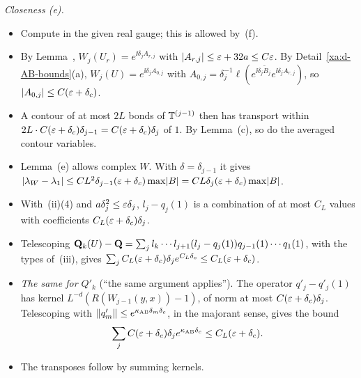 \begin{detail}
\emph{Closeness (e).}
\begin{itemize}
\item Compute in the given real gauge; this is allowed by~(f).
\item By Lemma~, $W_j(U_r)=e^{\ii\delta_jA_{r,j}}$ with $\lvert A_{r,j}\rvert\le\varepsilon+32a\le C\varepsilon$. By Detail~\ref{xa:d-AB-bounds}(a), $W_j(U)=e^{\ii\delta_jA_{0,j}}$ with $A_{0,j}=\delta_j^{-1}\ell(e^{\ii\delta_j\tilde B_j}e^{\ii\delta_jA_{r,j}})$, so $\lvert A_{0,j}\rvert\le C(\varepsilon+\delta_c)$.
\item A contour of at most $2L$ bonds of $\mathbb T^{(j-1)}$ then has transport within $2L\cdot C(\varepsilon+\delta_c)\delta_{j-1}=C(\varepsilon+\delta_c)\delta_j$ of $1$. By Lemma~(c), so do the averaged contour variables.
\item Lemma~(e) allows complex $W$. With $\delta=\delta_{j-1}$ it gives $\lvert\lambda_W-\lambda_1\rvert\le CL^2\delta_{j-1}(\varepsilon+\delta_c)\max\lvert B\rvert=CL\delta_j(\varepsilon+\delta_c)\max\lvert B\rvert$.
\item With~(ii)(4) and $a\delta_j^2\le\varepsilon\delta_j$, $l_j-q_j(1)$ is a combination of at most $C_L$ values with coefficients $C_L(\varepsilon+\delta_c)\delta_j$.
\item Telescoping $\mathbf Q_k(U)-\mathbf Q=\sum_jl_k\cdots l_{j+1}(l_j-q_j(1))q_{j-1}(1)\cdots q_1(1)$, with the types of~(iii), gives $\sum_jC_L(\varepsilon+\delta_c)\delta_je^{C_L\delta_c}\le C_L(\varepsilon+\delta_c)$.
\item \emph{The same for $Q'_k$} (``the same argument applies''). The operator $q'_j-q'_j(1)$ has kernel $L^{-d}(R(W_{j-1}(y,x))-1)$, of norm at most $C(\varepsilon+\delta_c)\delta_j$. Telescoping with $\lVert q'_m\rVert\le e^{\kappa_{\rm AB}\delta_m\delta_c}$, in the majorant sense, gives the bound
\[
\sum_jC(\varepsilon+\delta_c)\delta_je^{\kappa_{\rm AB}\delta_c}\le C_L(\varepsilon+\delta_c).
\]
\item The transposes follow by summing kernels.
\end{itemize}
\end{detail}

